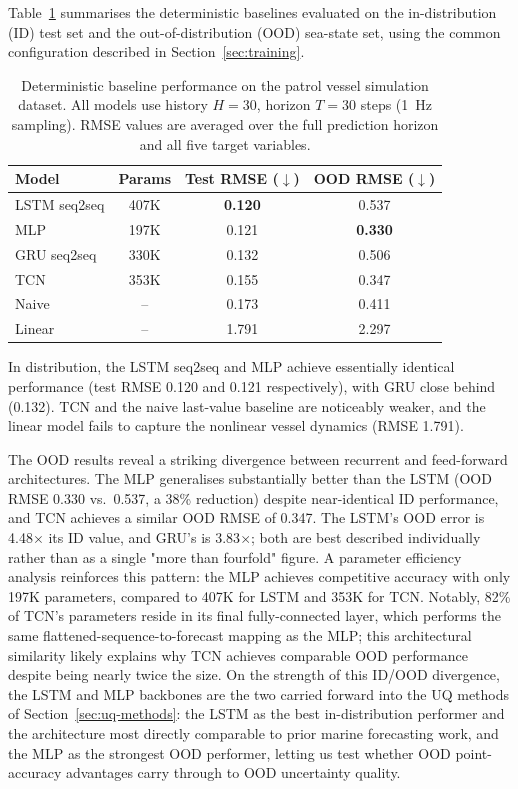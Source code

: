 \documentclass[a4paper,fleqn]{cas-sc}
\begin{document}
Table~\ref{tab:baseline-rmse} summarises the deterministic baselines evaluated on the in-distribution (ID) test set and the out-of-distribution (OOD) sea-state set, using the common configuration described in Section~\ref{sec:training}.
\begin{table}[t]
    \centering
    \caption{Deterministic baseline performance on the patrol vessel simulation dataset. All models use history $H=30$, horizon $T=30$ steps (1~Hz sampling). RMSE values are averaged over the full prediction horizon and all five target variables.}
    \label{tab:baseline-rmse}
    \begin{tabular}{lccc}
        \toprule
        \textbf{Model} & \textbf{Params} & \textbf{Test RMSE ($\downarrow$)} & \textbf{OOD RMSE ($\downarrow$)} \\
        \midrule
        LSTM seq2seq  & 407K & \textbf{0.120} & 0.537 \\
        MLP           & 197K & 0.121          & \textbf{0.330} \\
        GRU seq2seq   & 330K & 0.132          & 0.506 \\
        TCN           & 353K & 0.155          & 0.347 \\
        Naive         & --   & 0.173          & 0.411 \\
        Linear        & --   & 1.791          & 2.297 \\
        \bottomrule
    \end{tabular}
\end{table}
In distribution, the LSTM seq2seq and MLP achieve essentially identical performance (test RMSE 0.120 and 0.121 respectively), with GRU close behind (0.132). TCN and the naive last-value baseline are noticeably weaker, and the linear model fails to capture the nonlinear vessel dynamics (RMSE 1.791).

The OOD results reveal a striking divergence between recurrent and feed-forward architectures. The MLP generalises substantially better than the LSTM (OOD RMSE 0.330 vs.\ 0.537, a 38\% reduction) despite near-identical ID performance, and TCN achieves a similar OOD RMSE of 0.347. The LSTM's OOD error is 4.48$\times$ its ID value, and GRU's is 3.83$\times$; both are best described individually rather than as a single "more than fourfold" figure. A parameter efficiency analysis reinforces this pattern: the MLP achieves competitive accuracy with only 197K parameters, compared to 407K for LSTM and 353K for TCN. Notably, 82\% of TCN's parameters reside in its final fully-connected layer, which performs the same flattened-sequence-to-forecast mapping as the MLP; this architectural similarity likely explains why TCN achieves comparable OOD performance despite being nearly twice the size. On the strength of this ID/OOD divergence, the LSTM and MLP backbones are the two carried forward into the UQ methods of Section~\ref{sec:uq-methods}: the LSTM as the best in-distribution performer and the architecture most directly comparable to prior marine forecasting work, and the MLP as the strongest OOD performer, letting us test whether OOD point-accuracy advantages carry through to OOD uncertainty quality.
\end{document}
